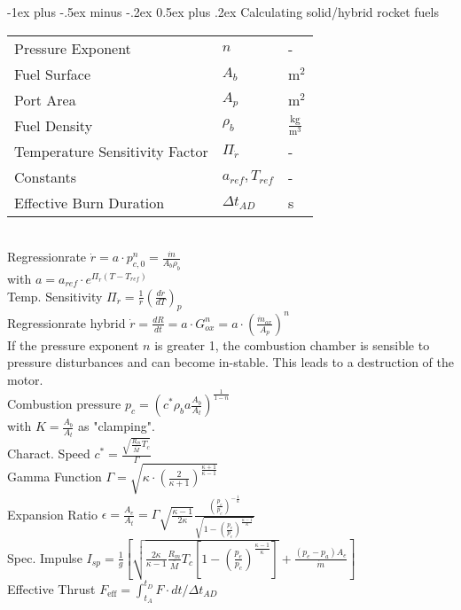 \documentclass[10pt,landscape]{article}
\makeatletter
\renewcommand{\section}{\@startsection{section}{1}{0mm}%
	{-1ex plus -.5ex minus -.2ex}%
	{0.5ex plus .2ex}%
	{\normalfont\large\bfseries}}
\makeatother
\begin{document}
\begin{multicols}{3}
		\section{Calculating solid/hybrid rocket fuels}
		\begin{tabular}{lll}
			Pressure Exponent & $n$ & - \\
			Fuel Surface & $A_b$ & $\text{m}^2$ \\
			Port Area & $A_p$ & $\text{m}^2$ \\
			Fuel Density & $\rho_b$ & $\frac{\text{kg}}{\text{m}^3}$ \\
			Temperature Sensitivity Factor & $\Pi_{\dot{r}}$ & - \\
			Constants & $a_{ref}, T_{ref}$ & - \\
			Effective Burn Duration & $\Delta t_{AD}$ & s \\
		\end{tabular}\\
		\vspace{7pt}
		Regressionrate $\dot{r}=a\cdot p_{c,0}^n = \frac{\dot{m}}{A_b\rho_b}$\\
		with $a = a_{ref}\cdot e^{\Pi_{\dot{r}} (T-T_{ref})}$\\
		Temp. Sensitivity $\Pi_{\dot{r}} = \frac{1}{\dot{r}} (\frac{d \dot{r}}{d T})_p$ \\
		\vspace{5pt}
		Regressionrate hybrid $\dot{r}=\frac{dR}{dt}=a\cdot G_{ox}^n = a\cdot (\frac{\dot{m}_{ox}}{A_p})^n$\\
		\vspace{5pt}
		If the pressure exponent $n$ is greater 1, the combustion chamber is sensible to pressure disturbances and can become in-stable. This leads to a destruction of the motor.\\
		\vspace{7pt}
		Combustion pressure $p_c = (c^* \rho_b a \frac{A_b}{A_t})^\frac{1}{1-n}$\\
		with $ K = \frac{A_b}{A_t}$ as "clamping".\\
		\vspace{5pt}
		Charact. Speed $c^* = \frac{\sqrt{\frac{R_m}{\bar{M}}T_c}}{\Gamma}$\\
		\vspace{5pt}
		Gamma Function $\Gamma = \sqrt{\kappa \cdot (\frac{2}{\kappa+1})^{\frac{\kappa+1}{\kappa-1}}}$\\
		\vspace{5pt}
		Expansion Ratio $\epsilon = \frac{A_e}{A_t} = \Gamma \sqrt{\frac{\kappa-1}{2 \kappa}} \frac{(\frac{p_e}{p_c})^{-\frac{1}{\kappa}}}{\sqrt{1-(\frac{p_e}{p_c})^\frac{\kappa-1}{\kappa}}}$\\
		\vspace{5pt}
		Spec. Impulse $I_{sp} = \frac{1}{g} \left[ \sqrt{\frac{2\kappa}{\kappa-1}\frac{R_m}{\bar{M}} T_c \left[1-(\frac{p_e}{p_c})^\frac{\kappa-1}{\kappa}\right]} + \frac{(p_e-p_a) A_e}{\dot{m}}\right]$\\
		\vspace{5pt}
		Effective Thrust $F_{\text{eff}}=\int_{t_A}^{t_D}F\cdot dt / \Delta t_{AD}$\\
		\vspace{5pt}
		

\end{multicols}
\end{document}
